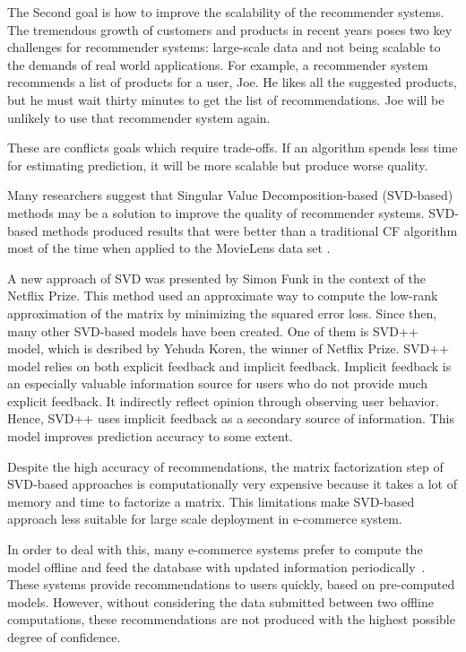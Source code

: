 \documentclass[oneside,13pt]{extreport}
\begin{document}
The Second goal is how to improve the scalability of the recommender systems. The tremendous growth of customers and products in recent years poses two key challenges for recommender systems: large-scale data and not being scalable to the demands of real world applications. For example, a recommender system recommends a list of products for a user, Joe. He likes all the suggested products, but he must wait thirty minutes to get the list of recommendations. Joe will be unlikely to use that recommender system again. 

These are conflicts goals which require trade-offs. If an algorithm spends less time for estimating prediction, it will be more scalable but produce worse quality. 

Many researchers suggest that Singular Value Decomposition-based (SVD-based) methods may be a solution to improve the quality of recommender systems. SVD-based methods produced results that were better than a traditional CF algorithm most of the time when applied to the MovieLens data set \cite{SarwarApplication}. 

A new approach of SVD was presented by Simon Funk in the context of the Netflix Prize\cite{SimonFunk}. This method used an approximate way to compute the low-rank approximation of the matrix by minimizing the squared error loss. Since then, many other SVD-based models have been created. One of them is SVD++ model, which is desribed by Yehuda Koren, the winner of Netflix Prize. SVD++ model relies on both explicit feedback and implicit feedback\cite{BellKorFactor}. Implicit feedback is an especially valuable information source for users who do not provide much explicit feedback. It indirectly reflect opinion through observing user behavior. Hence, SVD++ uses implicit feedback as a secondary source of information. This model improves prediction accuracy to some extent.

Despite the high accuracy of recommendations, the matrix factorization step of SVD-based approaches is computationally very expensive because it takes a lot of memory and time to factorize a matrix. This limitations make SVD-based approach less suitable for large scale deployment in e-commerce system. 

In order to deal with this, many e-commerce systems prefer to compute the model offline and feed the database with updated information periodically~\cite{Linden}. These systems provide recommendations to users quickly, based on pre-computed models. However, without considering the data submitted between two offline computations, these recommendations  are not produced with the highest possible degree of confidence. 
\end{document}
